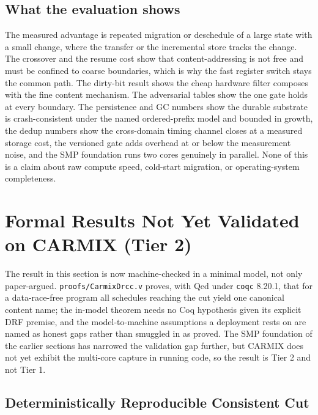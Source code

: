 \documentclass[10pt,twocolumn]{article}
\newcommand{\carmix}{CARMIX}
\begin{document}
\subsection{What the evaluation shows}

The measured advantage is repeated migration or deschedule of a large state with a
small change, where the transfer or the incremental store tracks the change. The
crossover and the resume cost show that content-addressing is not free and must be
confined to coarse boundaries, which is why the fast register switch stays the
common path. The dirty-bit result shows the cheap hardware filter composes with
the fine content mechanism. The adversarial tables show the one gate holds at every
boundary. The persistence and GC numbers show the durable substrate is
crash-consistent under the named ordered-prefix model and bounded in growth, the
dedup numbers show the cross-domain timing channel closes at a measured storage
cost, the versioned gate adds overhead at or below the measurement noise, and the
SMP foundation runs two cores genuinely in parallel. None of this is a claim about
raw compute speed, cold-start migration, or operating-system completeness.

\section{Formal Results Not Yet Validated on \carmix{} (Tier 2)}

The result in this section is now machine-checked in a minimal model, not only
paper-argued. \texttt{proofs/CarmixDrcc.v} proves, with Qed under \texttt{coqc}
8.20.1, that for a data-race-free program all schedules reaching the cut yield one
canonical content name; the in-model theorem needs no Coq hypothesis given its
explicit DRF premise, and the model-to-machine assumptions a deployment rests on
are named as honest gaps rather than smuggled in as proved. The SMP foundation of
the earlier sections has narrowed the validation gap further, but \carmix{} does
not yet exhibit the multi-core capture in running code, so the result is Tier 2 and
not Tier 1.

\subsection{Deterministically Reproducible Consistent Cut}
\end{document}
